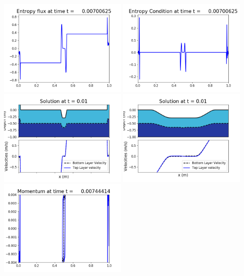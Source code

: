 \documentclass[11pt]{article}
\begin{document}
\includegraphics[width=0.475\textwidth]{frame0017fig1008.png}
\vskip 10pt 
\includegraphics[width=0.475\textwidth]{frame0017fig1009.png}
\vskip 10pt 
\includegraphics[width=0.475\textwidth]{frame0018fig1001.png}
\includegraphics[width=0.475\textwidth]{frame0018fig1002.png}
\vskip 10pt 
\includegraphics[width=0.475\textwidth]{frame0018fig1003.png}
\end{document}
